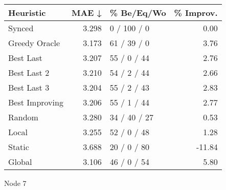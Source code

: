\begin{tabular}{lrlr}
\toprule
\textbf{Heuristic} & \textbf{MAE ↓} & \textbf{\% Be/Eq/Wo} & \textbf{\% Improv.} \\
\midrule
            Synced &          3.298 &          0 / 100 / 0 &                0.00 \\
     Greedy Oracle &          3.173 &          61 / 39 / 0 &                3.76 \\
         Best Last &          3.207 &          55 / 0 / 44 &                2.76 \\
       Best Last 2 &          3.210 &          54 / 2 / 44 &                2.66 \\
       Best Last 3 &          3.204 &          55 / 2 / 43 &                2.83 \\
    Best Improving &          3.206 &          55 / 1 / 44 &                2.77 \\
            Random &          3.280 &         34 / 40 / 27 &                0.53 \\
             Local &          3.255 &          52 / 0 / 48 &                1.28 \\
            Static &          3.688 &          20 / 0 / 80 &              -11.84 \\
            Global &          3.106 &          46 / 0 / 54 &                5.80 \\
\bottomrule
\end{tabular}
\caption{Node 7}
\label{tab:ds_iid_lr01_le2_bs2_7}
